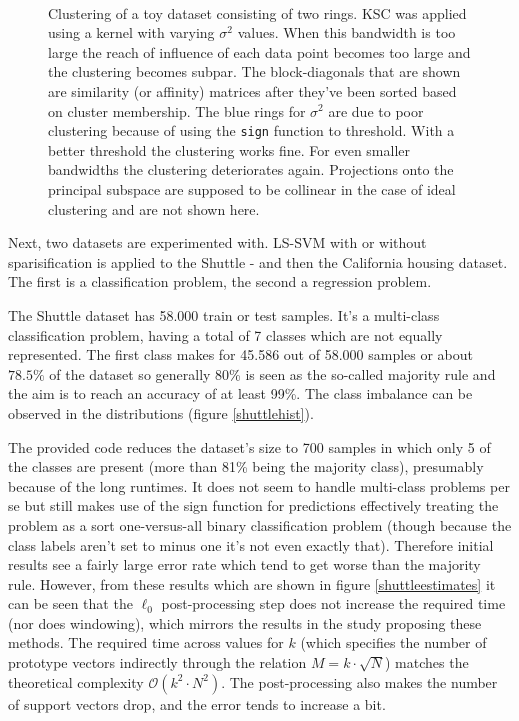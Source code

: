 \begin{figure}[h]
{\begin{minipage}{0.48\textwidth}
\end{minipage}}\\
%
\caption{Clustering of a toy dataset consisting of two rings. KSC was applied using a kernel with varying $\sigma^2$ values. When this bandwidth is too large the reach of influence of each data point becomes too large and the clustering becomes subpar. The block-diagonals that are shown are similarity (or affinity) matrices after they've been sorted based on cluster membership. The blue rings for $\sigma^2$ are due to poor clustering because of using the \texttt{sign} function to threshold. With a better threshold the clustering works fine. For even smaller bandwidths the clustering deteriorates again. Projections onto the principal subspace are supposed to be collinear in the case of ideal clustering and are not shown here.}
\label{spectraltoy}
\end{figure}


Next, two datasets are experimented with. LS-SVM with or without sparisification is applied to the Shuttle - and then the California housing dataset. The first is a classification problem, the second a regression problem.


The Shuttle dataset has 58.000 train or test samples. It's a multi-class classification problem, having a total of 7 classes which are not equally represented. The first class makes for 45.586 out of 58.000 samples or about $78.5\%$ of the dataset so generally 80\% is seen as the so-called majority rule and the aim is to reach an accuracy of at least 99\%. The class imbalance can be observed in the distributions (figure \ref{shuttlehist}).

\par The provided code reduces the dataset's size to 700 samples in which only 5 of the classes are present (more than 81\% being the majority class), presumably because of the long runtimes. It does not seem to handle multi-class problems per se but still makes use of the sign function for predictions effectively treating the problem as a sort one-versus-all binary classification problem (though because the class labels aren't set to minus one it's not even exactly that). Therefore initial results see a fairly large error rate which tend to get worse than the majority rule. However, from these results which are shown in figure \ref{shuttleestimates} it can be seen that the $\ell_0$ post-processing step does not increase the required time (nor does windowing), which mirrors the results in the study proposing these methods. The required time across values for $k$ (which specifies the number of prototype vectors indirectly through the relation $M=k\cdot\sqrt{N}$) matches the theoretical complexity $\mathcal{O}(k^2\cdot N^2)$. The post-processing also makes the number of support vectors drop, and the error tends to increase a bit.

